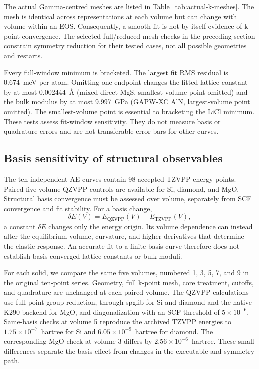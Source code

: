 The actual Gamma-centred meshes are listed in Table~\ref{tab:actual-k-meshes}. The mesh is identical across representations at each volume but can change with volume within an EOS. Consequently, a smooth fit is not by itself evidence of k-point convergence. The selected full/reduced-mesh checks in the preceding section constrain symmetry reduction for their tested cases, not all possible geometries and restarts.

Every full-window minimum is bracketed. The largest fit RMS residual is 0.674~meV per atom. Omitting one endpoint changes the fitted lattice constant by at most 0.002444~\AA{} (mixed-direct MgS, smallest-volume point omitted) and the bulk modulus by at most 9.997~GPa (GAPW-XC AlN, largest-volume point omitted). The smallest-volume point is essential to bracketing the LiCl minimum. These tests assess fit-window sensitivity. They do not measure basis or quadrature errors and are not transferable error bars for other curves.

\subsection{Basis sensitivity of structural observables}
\label{sec:solid-basis}

The ten independent AE curves contain 98 accepted TZVPP energy points. Paired five-volume QZVPP controls are available for Si, diamond, and MgO. Structural basis convergence must be assessed over volume, separately from SCF convergence and fit stability. For a basis change,
\begin{equation}
 \delta E(V)=E_{\mathrm{QZVPP}}(V)-E_{\mathrm{TZVPP}}(V),
\end{equation}
a constant $\delta E$ changes only the energy origin. Its volume dependence can instead alter the equilibrium volume, curvature, and higher derivatives that determine the elastic response. An accurate fit to a finite-basis curve therefore does not establish basis-converged lattice constants or bulk moduli.

For each solid, we compare the same five volumes, numbered 1, 3, 5, 7, and 9 in the original ten-point series. Geometry, full k-point mesh, core treatment, cutoffs, and quadrature are unchanged at each paired volume. The QZVPP calculations use full point-group reduction, through spglib for Si and diamond and the native K290 backend for MgO, and diagonalization with an SCF threshold of $5\times10^{-6}$. Same-basis checks at volume 5 reproduce the archived TZVPP energies to $1.75\times10^{-7}$~hartree for Si and $6.05\times10^{-9}$~hartree for diamond. The corresponding MgO check at volume 3 differs by $2.56\times10^{-6}$~hartree. These small differences separate the basis effect from changes in the executable and symmetry path.

